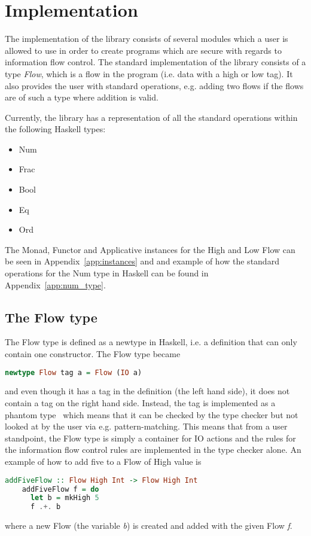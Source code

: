 \chapter{Implementation}
\label{chapter:implementation}
The implementation of the library consists of several modules which a user is allowed to use in order to create programs which are secure with regards to information flow control. The standard implementation of the library consists of a type \emph{Flow}, which is a flow in the program (i.e. data with a high or low tag). It also provides the user with standard operations, e.g. adding two flows if the flows are of such a type where addition is valid.

Currently, the library has a representation of all the standard operations within the following Haskell types:
\begin{itemize}
  \item Num
  \item Frac
  \item Bool
  \item Eq
  \item Ord
\end{itemize}

The Monad, Functor and Applicative instances for the High and Low Flow can be seen in Appendix~\ref{app:instances} and and example of how the standard operations for the Num type in Haskell can be found in Appendix~\ref{app:num_type}.
\section{The Flow type}
\label{sec:flow}
The Flow type is defined as a newtype in Haskell, i.e. a definition that can only contain one constructor. The Flow type became
\begin{center}
  \begin{lstlisting}[language=Haskell]
    newtype Flow tag a = Flow (IO a)
  \end{lstlisting}
\end{center}
and even though it has a tag in the definition (the left hand side), it does not contain a tag on the right hand side. Instead, the tag is implemented as a phantom type~\cite{haskell_phantom} which means that it can be checked by the type checker but not looked at by the user via e.g. pattern-matching. This means that from a user standpoint, the Flow type is simply a container for IO actions and the rules for the information flow control rules are implemented in the type checker alone. An example of how to add five to a Flow of High value is
\begin{center}
  \begin{lstlisting}[language=Haskell]
    addFiveFlow :: Flow High Int -> Flow High Int
    addFiveFlow f = do
      let b = mkHigh 5
      f .+. b
  \end{lstlisting}
\end{center}
where a new Flow (the variable \emph{b}) is created and added with the given Flow \emph{f}.

